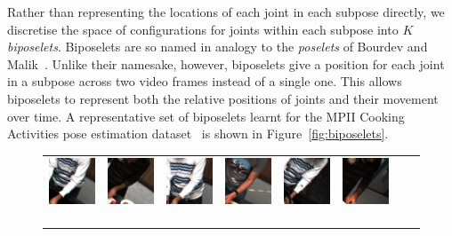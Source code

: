\documentclass[runningheads]{llncs}
\begin{document}
Rather than representing the locations of each joint in each subpose directly,
we discretise the space of configurations for joints within each subpose into
$K$ \textit{biposelets}. Biposelets are so named in analogy to the
\textit{poselets} of Bourdev and Malik~\cite{bourdev2009poselets}. Unlike their
namesake, however, biposelets give a position for each joint in a subpose across
two video frames instead of a single one. This allows biposelets to represent
both the relative positions of joints and their movement over time. A
representative set of biposelets learnt for the MPII Cooking Activities pose
estimation dataset~\cite{rohrbach2012database} is shown in
Figure~\ref{fig:biposelets}.

\begin{figure}[t]
\begin{center}
\begin{tabular}{@{}c@{}c@{}c@{}c@{}c@{}c@{}c@{}c@{}}
\includegraphics[height=0.1375\linewidth]{figures/biposelets/poselet-230/sample-1-f0.jpg}\,&
\includegraphics[height=0.1375\linewidth]{figures/biposelets/poselet-230/sample-2-f0.jpg}\,&
\includegraphics[height=0.1375\linewidth]{figures/biposelets/poselet-230/sample-3-f0.jpg}\,&
\includegraphics[height=0.1375\linewidth]{figures/biposelets/poselet-230/sample-4-f0.jpg}\,&
\includegraphics[height=0.1375\linewidth]{figures/biposelets/poselet-230/sample-5-f0.jpg}\,&
\includegraphics[height=0.1375\linewidth]{figures/biposelets/poselet-230/sample-6-f0.jpg}\,&

\end{tabular}
\end{center}
\end{figure}
\end{document}

